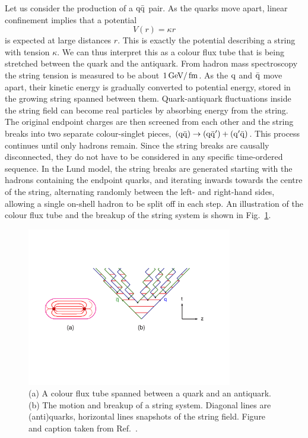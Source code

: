 Let us consider the production of a $\mathrm{q}\bar{\mathrm{q}}$ pair. As the quarks move apart,
linear confinement implies that a potential
\begin{equation}
  V(r) = \kappa r
\end{equation}
is expected at large distances $r$.  This is exactly the potential describing a
string with tension $\kappa$. We can thus interpret this as a colour flux tube that is being
stretched
between the quark and the antiquark. From hadron mass spectroscopy the string tension is
measured to be about $1\,\text{Ge\hspace{-.08em}V}/\text{\,fm}$.
As the $\mathrm{q}$ and $\bar{\mathrm{q}}$ move apart, their kinetic energy is gradually converted to potential
energy, stored in the growing string spanned between them. 
Quark-antiquark fluctuations inside the string field can become real particles by absorbing energy
from the string. The original endpoint charges are then screened from each other and the
string breaks into two separate colour-singlet pieces, $(\mathrm{q} \bar{\mathrm{q}}) \rightarrow (\mathrm{q}
\bar{\mathrm{q}}') + (\mathrm{q}' \bar{\mathrm{q}})$. This process continues until only hadrons remain.
Since the string breaks are causally disconnected, they do not have to be considered in any
specific time-ordered sequence. In the Lund model, the string breaks are generated starting
with the hadrons containing the endpoint quarks, and iterating inwards towards the centre of the
string, alternating randomly between the left- and right-hand sides, allowing a single on-shell
hadron to be split off in each step. An illustration of the colour flux tube and the breakup of the
string system is shown in Fig.~\ref{fig:hadronization_string}.

\begin{figure}[htpb]
  \centering
  \includegraphics[width=0.8\textwidth]{figures/eventreco_generation/stringone}
  \caption{ (a) A colour flux tube spanned between a quark and an antiquark. (b) The motion
and breakup of a string system. Diagonal lines are (anti)quarks, horizontal lines snapshots of
the string field. Figure and caption taken from Ref.~\cite{Buckley:2011ms}.
  \label{fig:hadronization_string}}
\end{figure}


